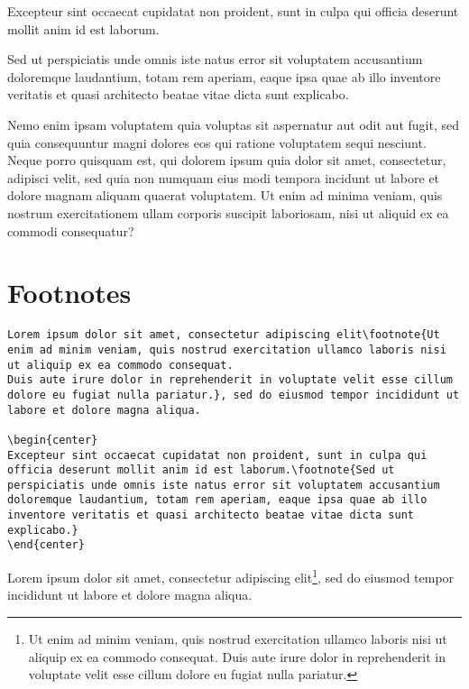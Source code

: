 \begin{center}
Excepteur sint occaecat cupidatat non proident, sunt in culpa qui officia deserunt mollit anim id est laborum.
\end{center}

\begin{flushright}
Sed ut perspiciatis unde omnis iste natus error sit voluptatem accusantium doloremque laudantium, totam rem aperiam, eaque ipsa quae ab illo inventore veritatis et quasi architecto beatae vitae dicta sunt explicabo.
\end{flushright}

Nemo enim ipsam voluptatem quia voluptas sit aspernatur aut odit aut fugit, sed quia consequuntur magni dolores eos qui ratione voluptatem sequi nesciunt.
\ccPar{}
Neque porro quisquam est, qui dolorem ipsum quia dolor sit amet, consectetur, adipisci velit, sed quia non numquam eius modi tempora incidunt ut labore et dolore magnam aliquam quaerat voluptatem.
\ccPar{}
Ut enim ad minima veniam, quis nostrum exercitationem ullam corporis suscipit laboriosam, nisi ut aliquid ex ea commodi consequatur?

\section*{Footnotes}%
\label{sec:footnotes}

\begin{lstlisting}[caption={Some footnotes.}]
Lorem ipsum dolor sit amet, consectetur adipiscing elit\footnote{Ut enim ad minim veniam, quis nostrud exercitation ullamco laboris nisi ut aliquip ex ea commodo consequat.
Duis aute irure dolor in reprehenderit in voluptate velit esse cillum dolore eu fugiat nulla pariatur.}, sed do eiusmod tempor incididunt ut labore et dolore magna aliqua.

\begin{center}
Excepteur sint occaecat cupidatat non proident, sunt in culpa qui officia deserunt mollit anim id est laborum.\footnote{Sed ut perspiciatis unde omnis iste natus error sit voluptatem accusantium doloremque laudantium, totam rem aperiam, eaque ipsa quae ab illo inventore veritatis et quasi architecto beatae vitae dicta sunt explicabo.}
\end{center}
\end{lstlisting}

Lorem ipsum dolor sit amet, consectetur adipiscing elit\footnote{Ut enim ad minim veniam, quis nostrud exercitation ullamco laboris nisi ut aliquip ex ea commodo consequat.
Duis aute irure dolor in reprehenderit in voluptate velit esse cillum dolore eu fugiat nulla pariatur.}, sed do eiusmod tempor incididunt ut labore et dolore magna aliqua.

